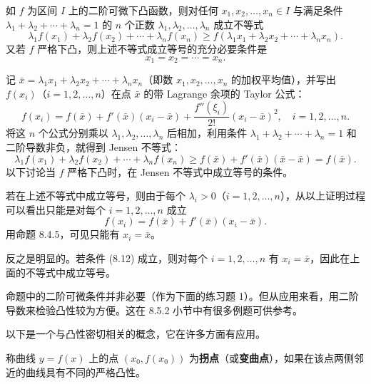 \begin{xtheorem}
如 $f$ 为区间 $I$ 上的二阶可微下凸函数，则对任何 $x_1,x_2,\ldots,x_n\in I$ 与满足条件 $\lambda_1+\lambda_2+\cdots+\lambda_n=1$ 的 $n$ 个正数 $\lambda_1,\lambda_2,\ldots,\lambda_n$ 成立不等式
\begin{equation}
  \lambda_1f(x_1)+\lambda_2f(x_2)+\cdots+\lambda_nf(x_n)
  \ge f(\lambda_1x_1+\lambda_2x_2+\cdots+\lambda_nx_n).
  \tag{8.11}
  \label{eq:8.11}
\end{equation}
又若 $f$ 严格下凸，则上述不等式成立等号的充分必要条件是
\begin{equation}
  x_1=x_2=\cdots=x_n.
  \tag{8.12}
  \label{eq:8.12}
\end{equation}
\end{xtheorem}
\begin{xproof}
记 $\bar x=\lambda_1x_1+\lambda_2x_2+\cdots+\lambda_nx_n$（即数 $x_1,x_2,\ldots,x_n$ 的加权平均值），并写出 $f(x_i)$（$i=1,2,\ldots,n$）在点 $\bar x$ 的带 Lagrange 余项的 Taylor 公式：
\[
  f(x_i)=f(\bar x)+f'(\bar x)(x_i-\bar x)+\frac{f''(\xi_i)}{2!}(x_i-\bar x)^2,
  \quad i=1,2,\ldots,n.
\]
将这 $n$ 个公式分别乘以 $\lambda_1,\lambda_2,\ldots,\lambda_n$ 后相加，利用条件 $\lambda_1+\lambda_2+\cdots+\lambda_n=1$ 和二阶导数非负，就得到 Jensen 不等式：
\[
  \lambda_1f(x_1)+\lambda_2f(x_2)+\cdots+\lambda_nf(x_n)
  \ge f(\bar x)+f'(\bar x)(\bar x-\bar x)=f(\bar x).
\]
以下讨论当 $f$ 严格下凸时，在 Jensen 不等式中成立等号的条件。

若在上述不等式中成立等号，则由于每个 $\lambda_i>0$（$i=1,2,\ldots,n$），从以上证明过程可以看出只能是对每个 $i=1,2,\ldots,n$ 成立
\[
  f(x_i)=f(\bar x)+f'(\bar x)(x_i-\bar x).
\]
用命题 8.4.5，可见只能有 $x_i=\bar x$。

反之是明显的。若条件 (8.12) 成立，则对每个 $i=1,2,\ldots,n$ 有 $x_i=\bar x$，因此在上面的不等式中成立等号。
\end{xproof}

\begin{xremark}
命题中的二阶可微条件并非必要（作为下面的练习题 1）。但从应用来看，用二阶导数来检验凸性较为方便。这在 8.5.2 小节中有很多例题可供参考。
\end{xremark}

以下是一个与凸性密切相关的概念，它在许多方面有应用。

\begin{xdefinition}
称曲线 $y=f(x)$ 上的点 $(x_0,f(x_0))$ 为\textbf{拐点}（或\textbf{变曲点}），如果在该点两侧邻近的曲线具有不同的严格凸性。
\end{xdefinition}

